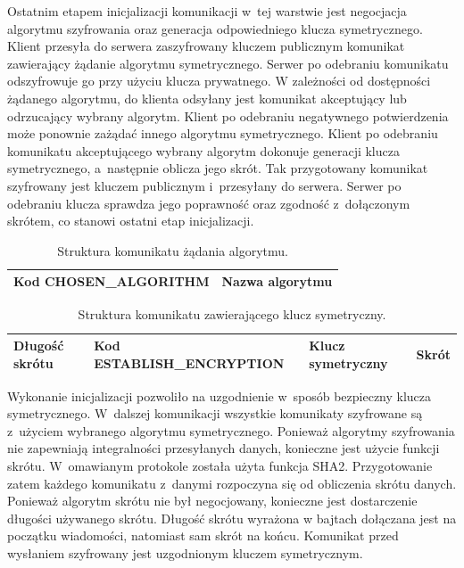 Ostatnim etapem inicjalizacji komunikacji w~tej warstwie jest
negocjacja algorytmu szyfrowania oraz generacja odpowiedniego klucza
symetrycznego. Klient przesyła do serwera zaszyfrowany kluczem
publicznym komunikat zawierający żądanie algorytmu
symetrycznego. Serwer po odebraniu komunikatu odszyfrowuje go przy
użyciu klucza prywatnego. W zależności od dostępności żądanego
algorytmu, do klienta odsyłany jest komunikat akceptujący lub
odrzucający wybrany algorytm. Klient po odebraniu negatywnego
potwierdzenia może ponownie zażądać innego algorytmu
symetrycznego. Klient po odebraniu komunikatu akceptującego wybrany
algorytm dokonuje generacji klucza symetrycznego, a~następnie oblicza
jego skrót. Tak przygotowany komunikat szyfrowany jest kluczem
publicznym i~przesyłany do serwera. Serwer po odebraniu klucza
sprawdza jego poprawność oraz zgodność z~dołączonym skrótem, co
stanowi ostatni etap inicjalizacji.

\begin{table}[H]
\centering
\caption{Struktura komunikatu żądania algorytmu. }

\begin{tabular}{|p{5cm}|p{6cm}|}
\hline
\raggedright{Kod CHOSEN\_ALGORITHM} & Nazwa algorytmu\\
\hline
\end{tabular}
\end{table}

\begin{table}[H]
\centering
\caption{Struktura komunikatu zawierającego klucz symetryczny.}

\begin{tabular}{|p{3cm}|p{5cm}|p{3cm}|p{2cm}|}
\hline
Długość skrótu & \raggedright{Kod ESTABLISH\_ENCRYPTION} & \raggedright{Klucz symetryczny} & Skrót \\
\hline
\end{tabular}
\end{table}

Wykonanie inicjalizacji pozwoliło na uzgodnienie w~sposób bezpieczny
klucza symetrycznego. W~dalszej komunikacji wszystkie komunikaty
szyfrowane są z~użyciem wybranego algorytmu symetrycznego. Ponieważ
algorytmy szyfrowania nie zapewniają integralności przesyłanych
danych, konieczne jest użycie funkcji skrótu. W~omawianym protokole
została użyta funkcja SHA2. Przygotowanie zatem każdego komunikatu
z~danymi rozpoczyna się od obliczenia skrótu danych. Ponieważ algorytm
skrótu nie był negocjowany, konieczne jest dostarczenie długości
używanego skrótu. Długość skrótu wyrażona w bajtach dołączana jest na
początku wiadomości, natomiast sam skrót na końcu. Komunikat przed
wysłaniem szyfrowany jest uzgodnionym kluczem symetrycznym.

